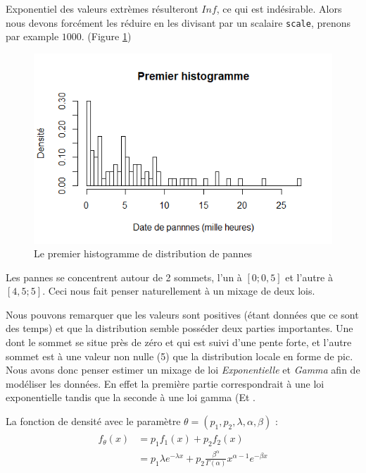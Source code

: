 \documentclass[10pt,a4paper]{article}
\begin{document}
Exponentiel des valeurs extrèmes résulteront $Inf$, ce qui est indésirable. Alors nous devons forcément les réduire en les divisant par un scalaire \texttt{scale}, prenons par example $1000$.  (Figure \ref{histo1})
\begin{figure}[!htb]
    \centering
    \includegraphics[width=\textwidth]{img/premier_histo.png}
    \caption{Le premier histogramme de distribution de pannes}
    \label{histo1}
\end{figure}

Les pannes se concentrent autour de 2 sommets, l'un à $[0; 0,5]$ et l'autre à $[4,5; 5]$. Ceci nous fait penser naturellement à un mixage de deux lois.

Nous pouvons remarquer que les valeurs sont positives (étant données que ce sont des temps) et que la
distribution semble posséder deux parties importantes. Une dont le sommet se situe près de zéro et qui est suivi d'une pente forte, et l'autre sommet est à une valeur non nulle (5) que la distribution locale en forme de pic.
Nous avons donc penser estimer un mixage de loi \emph{Exponentielle} et \emph{Gamma} afin de modéliser
les données. En effet la première partie correspondrait à une loi exponentielle tandis que la seconde à
une loi gamma (Et .

La fonction de densité avec le paramètre $\theta  = \left( {p_1, p_2, \lambda ,\alpha ,\beta } \right)$ :
\begin{align}
    \begin{split}
        \label{fMelExpGam}
        {f_\theta }\left( x \right) & = {p_1}{f_1}\left( x \right) + {p_2}{f_2}\left( x \right) \\
        & = {p_1}\lambda {e^{ - \lambda x}} + {p_2}\frac{{{\beta ^\alpha }}}{{\Gamma \left( \alpha  \right)}}{x^{\alpha  - 1}}{e^{ - \beta x}}
    \end{split}
\end{align}
\end{document}
